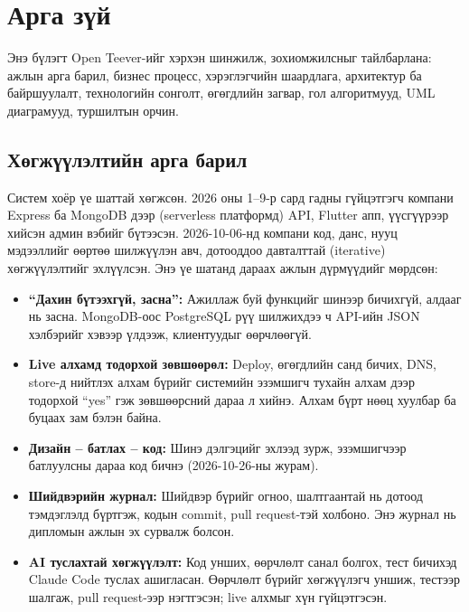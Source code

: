 \documentclass[
12pt,
oneside,
english,
onehalfspacing,
nolistspacing,
headsepline,
]{MUST-Thesis}
\begin{document}
\chapter{Арга зүй}

Энэ бүлэгт Open Teever-ийг хэрхэн шинжилж, зохиомжилсныг тайлбарлана: ажлын арга барил, бизнес процесс, хэрэглэгчийн шаардлага, архитектур ба байршуулалт, технологийн сонголт, өгөгдлийн загвар, гол алгоритмууд, UML диаграмууд, туршилтын орчин.

\section{Хөгжүүлэлтийн арга барил}

Систем хоёр үе шаттай хөгжсөн. 2026 оны 1--9-р сард гадны гүйцэтгэгч компани Express ба MongoDB дээр (serverless платформд) API, Flutter апп, үүсгүүрээр хийсэн админ вэбийг бүтээсэн. 2026-10-06-нд компани код, данс, нууц мэдээллийг өөртөө шилжүүлэн авч, дотооддоо давталттай (iterative) хөгжүүлэлтийг эхлүүлсэн. Энэ үе шатанд дараах ажлын дүрмүүдийг мөрдсөн:

\begin{itemize}
    \item \textbf{``Дахин бүтээхгүй, засна'':} Ажиллаж буй функцийг шинээр бичихгүй, алдааг нь засна. MongoDB-оос PostgreSQL рүү шилжихдээ ч API-ийн JSON хэлбэрийг хэвээр үлдээж, клиентуудыг өөрчлөөгүй.
    \item \textbf{Live алхамд тодорхой зөвшөөрөл:} Deploy, өгөгдлийн санд бичих, DNS, store-д нийтлэх алхам бүрийг системийн эзэмшигч тухайн алхам дээр тодорхой ``yes'' гэж зөвшөөрсний дараа л хийнэ. Алхам бүрт нөөц хуулбар ба буцаах зам бэлэн байна.
    \item \textbf{Дизайн -- батлах -- код:} Шинэ дэлгэцийг эхлээд зурж, эзэмшигчээр батлуулсны дараа код бичнэ (2026-10-26-ны журам).
    \item \textbf{Шийдвэрийн журнал:} Шийдвэр бүрийг огноо, шалтгаантай нь дотоод тэмдэглэлд бүртгэж, кодын commit, pull request-тэй холбоно. Энэ журнал нь дипломын ажлын эх сурвалж болсон.
    \item \textbf{AI туслахтай хөгжүүлэлт:} Код унших, өөрчлөлт санал болгох, тест бичихэд Claude Code туслах ашигласан. Өөрчлөлт бүрийг хөгжүүлэгч уншиж, тестээр шалгаж, pull request-ээр нэгтгэсэн; live алхмыг хүн гүйцэтгэсэн.
\end{itemize}
\end{document}
